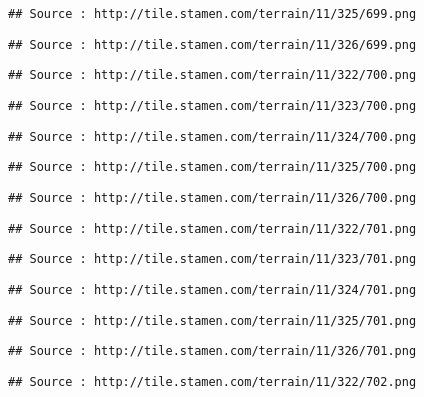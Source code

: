 \documentclass[
]{article}
\begin{document}
\begin{verbatim}
## Source : http://tile.stamen.com/terrain/11/325/699.png
\end{verbatim}

\begin{verbatim}
## Source : http://tile.stamen.com/terrain/11/326/699.png
\end{verbatim}

\begin{verbatim}
## Source : http://tile.stamen.com/terrain/11/322/700.png
\end{verbatim}

\begin{verbatim}
## Source : http://tile.stamen.com/terrain/11/323/700.png
\end{verbatim}

\begin{verbatim}
## Source : http://tile.stamen.com/terrain/11/324/700.png
\end{verbatim}

\begin{verbatim}
## Source : http://tile.stamen.com/terrain/11/325/700.png
\end{verbatim}

\begin{verbatim}
## Source : http://tile.stamen.com/terrain/11/326/700.png
\end{verbatim}

\begin{verbatim}
## Source : http://tile.stamen.com/terrain/11/322/701.png
\end{verbatim}

\begin{verbatim}
## Source : http://tile.stamen.com/terrain/11/323/701.png
\end{verbatim}

\begin{verbatim}
## Source : http://tile.stamen.com/terrain/11/324/701.png
\end{verbatim}

\begin{verbatim}
## Source : http://tile.stamen.com/terrain/11/325/701.png
\end{verbatim}

\begin{verbatim}
## Source : http://tile.stamen.com/terrain/11/326/701.png
\end{verbatim}

\begin{verbatim}
## Source : http://tile.stamen.com/terrain/11/322/702.png
\end{verbatim}
\end{document}
